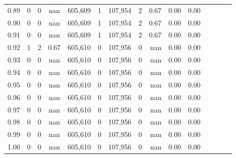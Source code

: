 \begin{tabular}{rrrcrrrrrrrrrrr}
0.89 &       0 &      0 &                                        nan &  605,609 &        1 &  107,954 &        2 &  0.67 &  0.00 &                         0.00 \\
0.90 &       0 &      0 &                                        nan &  605,609 &        1 &  107,954 &        2 &  0.67 &  0.00 &                         0.00 \\
0.91 &       0 &      0 &                                        nan &  605,609 &        1 &  107,954 &        2 &  0.67 &  0.00 &                         0.00 \\
0.92 &       1 &      2 &                                       0.67 &  605,610 &        0 &  107,956 &        0 &   nan &  0.00 &                         0.00 \\
0.93 &       0 &      0 &                                        nan &  605,610 &        0 &  107,956 &        0 &   nan &  0.00 &                         0.00 \\
0.94 &       0 &      0 &                                        nan &  605,610 &        0 &  107,956 &        0 &   nan &  0.00 &                         0.00 \\
0.95 &       0 &      0 &                                        nan &  605,610 &        0 &  107,956 &        0 &   nan &  0.00 &                         0.00 \\
0.96 &       0 &      0 &                                        nan &  605,610 &        0 &  107,956 &        0 &   nan &  0.00 &                         0.00 \\
0.97 &       0 &      0 &                                        nan &  605,610 &        0 &  107,956 &        0 &   nan &  0.00 &                         0.00 \\
0.98 &       0 &      0 &                                        nan &  605,610 &        0 &  107,956 &        0 &   nan &  0.00 &                         0.00 \\
0.99 &       0 &      0 &                                        nan &  605,610 &        0 &  107,956 &        0 &   nan &  0.00 &                         0.00 \\
1.00 &       0 &      0 &                                        nan &  605,610 &        0 &  107,956 &        0 &   nan &  0.00 &                         0.00 \\
\bottomrule
\end{tabular}
